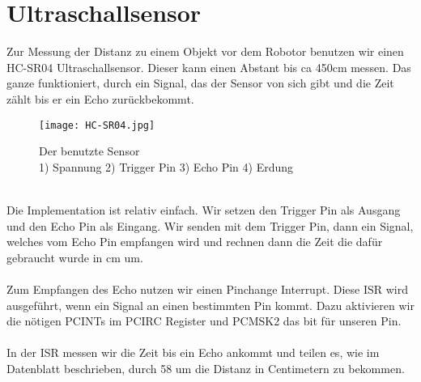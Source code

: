 \documentclass{article}
\begin{document}
\section{Ultraschallsensor} %
Zur Messung der Distanz zu einem Objekt vor dem Robotor benutzen wir einen HC-SR04 Ultraschallsensor. Dieser kann einen Abstant bis ca 450cm messen. Das ganze funktioniert, durch ein Signal, das der Sensor von sich gibt und die Zeit zählt bis er ein Echo zurückbekommt.\\
\begin{figure}[h]
	\texttt{[image: HC-SR04.jpg]}
	\centering
	\caption{Der benutzte Sensor \\1) Spannung 2) Trigger Pin 3) Echo Pin 4) Erdung}
\end{figure} 
\\
Die Implementation ist relativ einfach. Wir setzen den Trigger Pin als Ausgang und den Echo Pin als Eingang. Wir senden mit dem Trigger Pin, dann ein Signal, welches vom Echo Pin empfangen wird und rechnen dann die Zeit die dafür gebraucht wurde in cm um.\\
\\
Zum Empfangen des Echo nutzen wir einen Pinchange Interrupt. Diese ISR wird ausgeführt, wenn ein Signal an einen bestimmten Pin kommt. Dazu aktivieren wir die nötigen PCINTs im PCIRC Register und PCMSK2 das bit für unseren Pin.\\
\\
In der ISR messen wir die Zeit bis ein Echo ankommt und teilen es, wie im Datenblatt beschrieben, durch 58 um die Distanz in Centimetern zu bekommen.
\end{document}

